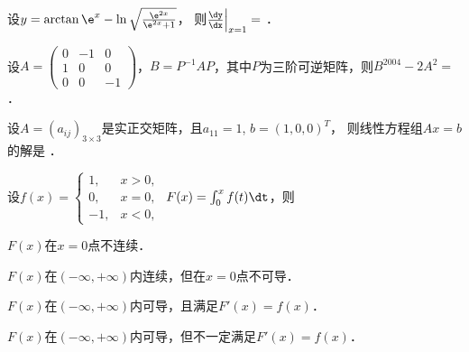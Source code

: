 \documentclass[plain,noanswer,medmath]{../../template/jnuexam}
\begin{document}








\begin{problem}
设$y = \arctan \e^x - \ln \sqrt{\frac{\e^{2x}}{\e^{2x} + 1}}$，
则$\frac{\dy}{\dx}\Big|_{x = 1} =$ \fillin{}．
\end{problem}




\begin{problem}
设$A = \begin{pmatrix}
  0 & -1 & 0 \\
  1 &  0 & 0 \\
  0 &  0 & -1
\end{pmatrix}$，$B = P^{-1} AP$，其中$P$为三阶可逆矩阵，则$B^{2004} - 2A^2 =$ \fillin{}．
\end{problem}


\begin{problem}
设$A = (a_{ij})_{3 \times 3}$是实正交矩阵，且$a_{11} = 1$, $b = (1,0,0)^T$，
则线性方程组$Ax = b$的解是 \fillin{}．
\end{problem}












\begin{problem}
设$f(x) = \begin{cases}
   1, & x > 0, \\
   0, & x = 0, \\
  -1, & x < 0,
\end{cases}$ $F(x) = \int_0^x f(t)\dt$，则\pickout{}
\begin{abcd}
\item $F(x)$在$x = 0$点不连续．
\item $F(x)$在$(-\infty , +\infty)$内连续，但在$x = 0$点不可导．
\item $F(x)$在$(-\infty , +\infty)$内可导，且满足$F'(x) = f(x)$．
\item $F(x)$在$(-\infty , +\infty)$内可导，但不一定满足$F'(x) = f(x)$．
\end{abcd}
\end{problem}
\end{document}
